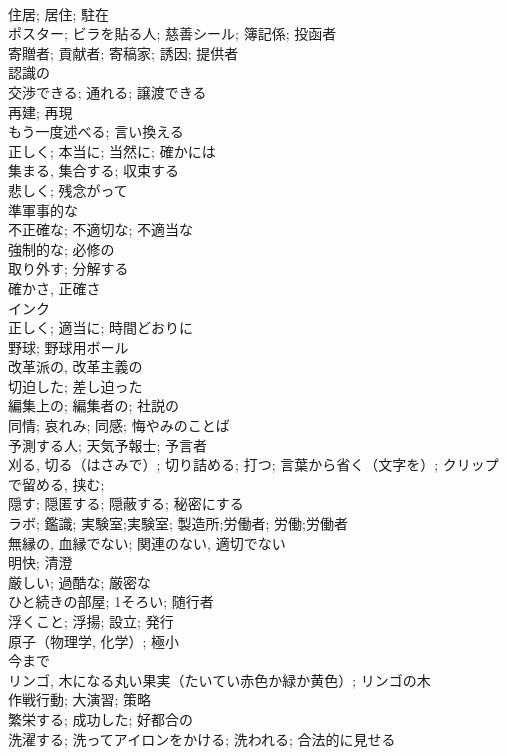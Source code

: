 \documentclass[8pt]{extreport}
\begin{document}
\begin{CJK}{UTF8}{min}
\\	住居; 居住; 駐在	
\\	ポスター; ビラを貼る人; 慈善シール; 簿記係; 投函者	
\\	寄贈者; 貢献者; 寄稿家; 誘因; 提供者	
\\	認識の	
\\	交渉できる; 通れる; 譲渡できる	
\\	再建; 再現	
\\	もう一度述べる; 言い換える	
\\	正しく; 本当に; 当然に; 確かには	
\\	集まる, 集合する; 収束する	
\\	悲しく; 残念がって	
\\	準軍事的な	
\\	不正確な; 不適切な; 不適当な	
\\	強制的な; 必修の	
\\	取り外す; 分解する	
\\	確かさ, 正確さ	
\\	インク	
\\	正しく; 適当に; 時間どおりに	
\\	野球; 野球用ボール	
\\	改革派の, 改革主義の	
\\	切迫した; 差し迫った	
\\	編集上の; 編集者の; 社説の	
\\	同情; 哀れみ; 同感; 悔やみのことば	
\\	予測する人; 天気予報士; 予言者	
\\	刈る, 切る（はさみで）; 切り詰める; 打つ; 言葉から省く（文字を）; クリップで留める, 挟む;	
\\	隠す; 隠匿する; 隠蔽する; 秘密にする	
\\	ラボ; 鑑識; 実験室;実験室; 製造所;労働者; 労働;労働者	
\\	無縁の, 血縁でない; 関連のない, 適切でない	
\\	明快; 清澄	
\\	厳しい; 過酷な; 厳密な	
\\	ひと続きの部屋; 1そろい; 随行者	
\\	浮くこと; 浮揚; 設立; 発行	
\\	原子（物理学, 化学）; 極小	
\\	今まで	
\\	リンゴ, 木になる丸い果実（たいてい赤色か緑か黄色）; リンゴの木	
\\	作戦行動; 大演習; 策略	
\\	繁栄する; 成功した; 好都合の	
\\	洗濯する; 洗ってアイロンをかける; 洗われる; 合法的に見せる	

\end{CJK}
\end{document}
